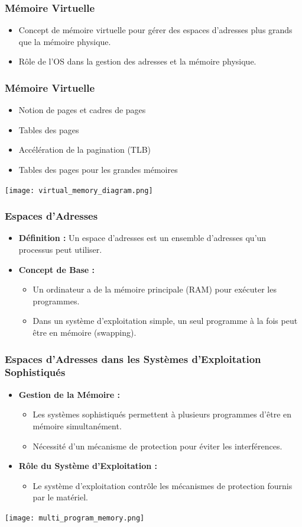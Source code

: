 \documentclass{beamer}
\begin{document}
\begin{frame}
\frametitle{Mémoire Virtuelle}
\begin{itemize}
    \item Concept de mémoire virtuelle pour gérer des espaces d'adresses plus grands que la mémoire physique.
    \item Rôle de l'OS dans la gestion des adresses et la mémoire physique.
\end{itemize}
\end{frame}

\begin{frame}
\frametitle{Mémoire Virtuelle}
\begin{itemize}
    \item Notion de pages et cadres de pages
    \item Tables des pages
    \item Accélération de la pagination (TLB)
    \item Tables des pages pour les grandes mémoires
\end{itemize}
\texttt{[image: virtual\_memory\_diagram.png]}
\end{frame}

\begin{frame}
\frametitle{Espaces d'Adresses}
\begin{itemize}
    \item \textbf{Définition :} Un espace d'adresses est un ensemble d'adresses qu'un processus peut utiliser.
    \item \textbf{Concept de Base :}
    \begin{itemize}
        \item Un ordinateur a de la mémoire principale (RAM) pour exécuter les programmes.
        \item Dans un système d'exploitation simple, un seul programme à la fois peut être en mémoire (swapping).
    \end{itemize}
\end{itemize}
\end{frame}

\begin{frame}
\frametitle{Espaces d'Adresses dans les Systèmes d'Exploitation Sophistiqués}
\begin{itemize}
    \item \textbf{Gestion de la Mémoire :}
    \begin{itemize}
        \item Les systèmes sophistiqués permettent à plusieurs programmes d'être en mémoire simultanément.
        \item Nécessité d'un mécanisme de protection pour éviter les interférences.
    \end{itemize}
    \item \textbf{Rôle du Système d'Exploitation :}
    \begin{itemize}
        \item Le système d'exploitation contrôle les mécanismes de protection fournis par le matériel.
    \end{itemize}
\end{itemize}
\texttt{[image: multi\_program\_memory.png]}
\end{frame}
\end{document}
